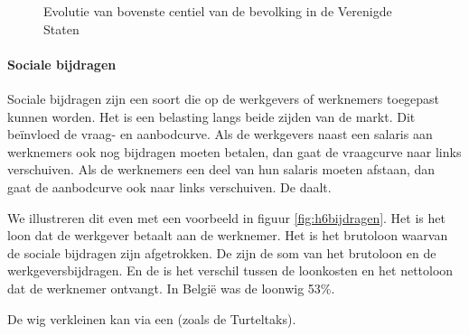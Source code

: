 \begin{figure}[H]
\small\centering\captionsetup{justification=centering,margin=2cm}
\caption{Evolutie van bovenste centiel van de bevolking in de Verenigde Staten}
\label{fig:h6centiel}
\end{figure}

\paragraph{Sociale bijdragen}

Sociale bijdragen zijn een soort  die op de werkgevers of werknemers toegepast kunnen worden. Het is een belasting langs beide zijden van de markt. Dit be\"invloed de vraag- en aanbodcurve. Als de werkgevers naast een salaris aan werknemers ook nog bijdragen moeten betalen, dan gaat de vraagcurve naar links verschuiven. Als de werknemers een deel van hun salaris moeten afstaan, dan gaat de aanbodcurve ook naar links verschuiven. De  daalt.\\

\par We illustreren dit even met een voorbeeld in figuur \ref{fig:h6bijdragen}. Het  is het loon dat de werkgever betaalt aan de werknemer. Het  is het brutoloon waarvan de sociale bijdragen zijn afgetrokken. De  zijn de som van het brutoloon en de werkgeversbijdragen. En de  is het verschil tussen de loonkosten en het nettoloon dat de werknemer ontvangt. In Belgi\"e was de loonwig 53\%.
\par De wig verkleinen kan via een  (zoals de Turteltaks).

